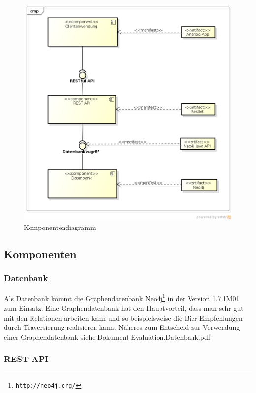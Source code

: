 \documentclass[10pt,a4paper]{scrartcl}
\begin{document}
\begin{figure}[H]
	\includegraphics[width=\textwidth]{ComponentDiagram.png}
	\caption{Komponentendiagramm}
	\label{fig:component_diagram}
\end{figure}


\subsection{Komponenten}

\subsubsection{Datenbank}

Als Datenbank kommt die Graphendatenbank Neo4j\footnote{\texttt{http://neo4j.org/}} in der Version 1.7.1M01 zum Einsatz.
Eine Graphendatenbank hat den Hauptvorteil, dass man sehr gut mit den Relationen arbeiten kann und
so beispielsweise die Bier-Empfehlungen durch Traversierung realisieren kann. Näheres zum Entscheid
zur Verwendung einer Graphendatenbank siehe Dokument Evaluation.Datenbank.pdf

\subsubsection{REST API}
\end{document}
